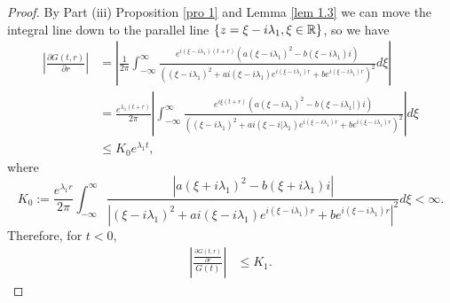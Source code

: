 \documentclass[12pt,letterpaper]{amsart}
\theoremstyle{definition}
\theoremstyle{remark}
\numberwithin{equation}{section}
\begin{document}
\begin{proof}
By Part (iii) Proposition \ref{pro 1} and Lemma \ref{lem 1.3} we can move the integral line down to the parallel line $\{ z=\xi -i \lambda_1, \xi \in \mathbb R\}$, so we have
\begin{align}
\left|  \frac{\partial G(t,r)}{\partial r} \right| &= \left| \frac{1}{2\pi}  \int_{-\infty}^{\infty} 
\frac{e^{i(\xi-i\lambda_1) (t+r)}\left(a(\xi-i\lambda_1)^2-b(\xi-i\lambda_1) i\right)}
{\left((\xi-i\lambda_1)^2+ai(\xi-i\lambda_1) e^{i(\xi-i\lambda_1) r}+be^{i(\xi-i\lambda_1) r}\right)^2} d\xi \right|   \nonumber\\
 &= \frac{e^{\lambda_1(t+r)}}{2\pi} \left| \int_{-\infty}^{\infty} \frac{e^{i\xi (t+r)}\left(a(\xi-i\lambda_1)^2-b(\xi-i\lambda_1|) i\right)}
 {\left((\xi-i\lambda_1)^2+ai(\xi-i|\lambda_1) e^{i(\xi-i\lambda_1) r}+be^{i(\xi-i\lambda_1) r}\right)^2} \right| d\xi \nonumber \\
 &\le K_0e^{\lambda_1t} , \label{2.3} 
 \end{align}
where 
$$
K_0:=\frac{e^{\lambda_1 r}}{2\pi}\int_{-\infty}^{\infty} \frac{\left|a(\xi+i\lambda_1)^2-b(\xi+i\lambda_1) i\right|}{\left|(\xi-i\lambda_1)^2+ai(\xi-i\lambda_1) e^{i(\xi-i\lambda_1) r}+be^{i(\xi-i\lambda_1) r}\right|^2} d\xi <\infty .
$$
Therefore, for $t<0$,
\begin{align}
\left|  \frac{\frac{\partial G(t,r)}{\partial r}}{G(t)}  \right| &\le K_1 .
\end{align}
\end{proof}
\end{document}
